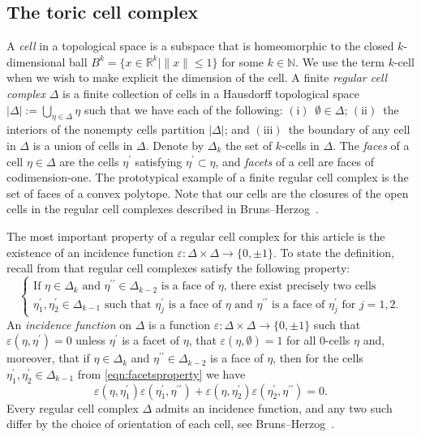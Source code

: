 \documentclass[11pt,a4paper]{amsart}
\numberwithin{equation}{section}
\theoremstyle{definition}
\theoremstyle{remark}
\newcommand{\NN}{\ensuremath{\mathbb{N}}}
\newcommand{\RR}{\ensuremath{\mathbb{R}}}
\newcommand{\one}{\ensuremath{(\mathrm{i})}}
\newcommand{\two}{\ensuremath{(\mathrm{ii})}}
\newcommand{\three}{\ensuremath{(\mathrm{iii})}}
\begin{document}
\subsection{The toric cell complex}
\label{sec:CWcomplex}
A \emph{cell} in a topological space is a subspace that is homeomorphic to the closed $k$-dimensional ball $B^k=\{ x \in \RR^k \mid \|x\| \leq 1\}$ for some $k\in \NN$. We use the term $k$-cell when we wish to make explicit the dimension of the cell. A finite \emph{regular cell complex} $\Delta$ is a finite collection of cells in a Hausdorff topological space $\vert\Delta\vert:=\bigcup_{\eta \in \Delta}\eta$ such that we have each of the following: \one\ $\emptyset \in \Delta$; \two\ the interiors of the nonempty cells partition $\vert\Delta\vert$; and  \three\ the boundary of any cell in $\Delta$ is a union of cells in $\Delta$. Denote by $\Delta_k$ the set of $k$-cells in $\Delta$. The \emph{faces} of a cell $\eta\in \Delta$ are the cells $\eta^\prime$ satisfying $\eta^\prime\subset \eta$, and \emph{facets} of a cell are faces of codimension-one. The prototypical example of a finite regular cell complex is the set of faces of a convex polytope. Note that our cells are the closures of the open cells in the regular cell complexes described in Bruns--Herzog~\cite[\S6.2]{BrunsHerzog}.  

The most important property of a regular cell complex for this article is the existence of an incidence function $\varepsilon\colon \Delta\times\Delta\rightarrow \{0,\pm 1\}$.  To state the definition, recall from \cite[\S6.2]{BrunsHerzog} that regular cell complexes satisfy the following property:
\begin{equation}
\label{eqn:facetsproperty}
\left\{\begin{array}{c} \text{If $\eta\in \Delta_k$ and $\eta^{\prime\prime}\in \Delta_{k-2}$ is a face of $\eta$, there exist precisely two cells} \\
\text{$\eta_1^\prime, \eta_2^\prime\in \Delta_{k-1}$ such that $\eta_j^\prime$ is a face of $\eta$ and $\eta^{\prime\prime}$ is a face of $\eta_j^{\prime}$ for $j=1,2$.}\end{array}\right.
\end{equation}
An \emph{incidence function} on $\Delta$ is a function $\varepsilon \colon \Delta\times \Delta \longrightarrow  \{0,\pm1\}$ such that $\varepsilon(\eta,\eta^\prime)= 0$ unless $\eta^\prime$ is a facet of $\eta$, that $\varepsilon(\eta,\emptyset) = 1$ for all 0-cells $\eta$ and, moreover, that if $\eta\in \Delta_k$ and $\eta^{\prime\prime}\in \Delta_{k-2}$ is a face of $\eta$, then for the cells $\eta_1^\prime, \eta_2^\prime\in \Delta_{k-1}$ from \eqref{eqn:facetsproperty} we have 
\begin{equation}
\label{eqn:signcondition}
\varepsilon(\eta,\eta_1^\prime) \varepsilon(\eta_1^\prime,\eta^{\prime\prime}) +\varepsilon(\eta,\eta_2^\prime) \varepsilon(\eta_2^\prime,\eta^{\prime\prime})= 0.
\end{equation}
Every regular cell complex $\Delta$ admits an incidence function, and any two such differ by the choice of orientation of each cell, see Bruns--Herzog~\cite[Lemma 6.2.1, Theorem 6.2.2]{BrunsHerzog}.  
\end{document}
